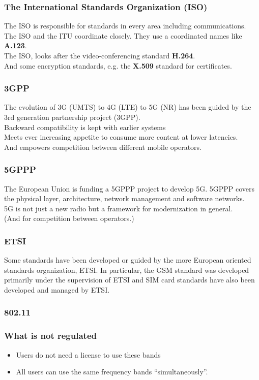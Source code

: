 \documentclass[18pt]{beamer}
\begin{document}
\begin{frame}\LARGE
\frametitle{The International Standards Organization (ISO)}
\large
The ISO is responsible for standards in every area
including communications.\\[4mm] 
The ISO and the ITU coordinate closely.
They use a coordinated names like {\bf A.123}.\\[4mm]
%
The ISO, looks after the video-conferencing standard {\bf H.264}.\\[4mm]
And some encryption standards, e.g. the {\bf X.509} standard for certificates.
\end{frame}

\begin{frame}\LARGE
\frametitle{3GPP}
\Large
The evolution of 3G (UMTS) to 4G (LTE) to 5G (NR) 
has been guided by the 3rd generation partnership project (3GPP).\\[3mm]
Backward compatibility is kept with earlier systems\\[3mm]
%
Meets ever increasing appetite to consume more content at lower latencies.  \\[3mm]
And empowers competition between different mobile operators.
\end{frame}

\begin{frame}\LARGE
\frametitle{5GPPP}
The European Union is funding a 5GPPP project
to develop 5G. 5GPPP covers the physical layer,
architecture, network management and software networks.\\[3mm]
%
5G is not just a new radio but a framework 
for modernization in general.\\[3mm]
%
(And for competition between operators.)
\end{frame}

\begin{frame}\LARGE
\frametitle{ETSI}
Some standards have been developed or guided by the more European
oriented standards organization, ETSI. In particular, the GSM \cite{GSM}
standard was developed primarily under the supervision of ETSI and
SIM card standards have also been developed and managed by ETSI.
\end{frame}

\begin{frame}\LARGE
\frametitle{802.11}
\end{frame}

\begin{frame}\LARGE
\frametitle{What is not regulated}
\begin{itemize}\Large
\item Users do not need a license to use these bands
\item All users can use the same frequency bands ``simultaneously''.
\end{itemize}
\end{frame}
\end{document}
